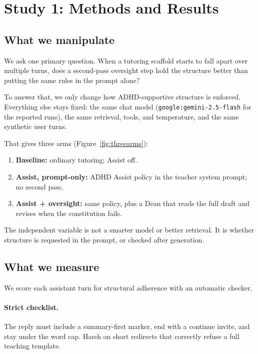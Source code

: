 \section{Study 1: Methods and Results}
\label{sec:study1}

\subsection{What we manipulate}

We ask one primary question. When a tutoring scaffold starts to fall apart
over multiple turns, does a second-pass oversight step hold the structure
better than putting the same rules in the prompt alone?

To answer that, we only change how ADHD-supportive structure is enforced.
Everything else stays fixed: the same chat model
(\texttt{google:gemini-2.5-flash} for the reported runs), the same retrieval,
tools, and temperature, and the same synthetic user turns.

That gives three arms (Figure~\ref{fig:threearms}):
\begin{enumerate}
  \item \textbf{Baseline:} ordinary tutoring; Assist off.
  \item \textbf{Assist, prompt-only:} ADHD Assist policy in the teacher system
    prompt; no second pass.
  \item \textbf{Assist + oversight:} same policy, plus a Dean that reads the
    full draft and revises when the constitution fails.
\end{enumerate}

The independent variable is not a smarter model or better retrieval. It is
whether structure is requested in the prompt, or checked after generation.

\subsection{What we measure}

We score each assistant turn for structural adherence with an automatic
checker.

\paragraph{Strict checklist.}
The reply must include a summary-first marker, end with a continue invite, and
stay under the word cap. Harsh on short redirects that correctly refuse a full
teaching template.

